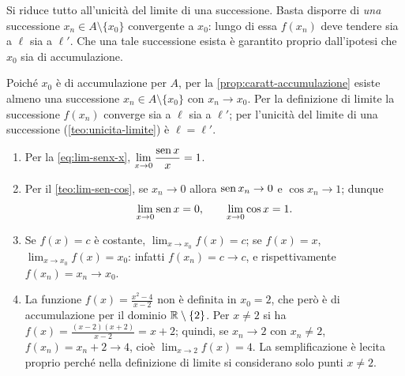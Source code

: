 \begin{schema}
\end{schema}

\begin{strategia}
Si riduce tutto all'unicità del limite di una successione. Basta disporre di
\emph{una} successione $x_{n}\in A\setminus\{x_{0}\}$ convergente a $x_{0}$: lungo di
essa $f(x_{n})$ deve tendere sia a $\ell$ sia a $\ell'$. Che una tale successione esista
è garantito proprio dall'ipotesi che $x_{0}$ sia di accumulazione.
\end{strategia}

\begin{dimostrazione}
Poiché $x_{0}$ è di accumulazione per $A$, per la \cref{prop:caratt-accumulazione}
esiste almeno una successione $x_{n}\in A\setminus\{x_{0}\}$ con $x_{n}\to x_{0}$. Per
la definizione di limite la successione $f(x_{n})$ converge sia a $\ell$ sia a $\ell'$;
per l'unicità del limite di una successione (\cref{teo:unicita-limite}) è $\ell=\ell'$.
\end{dimostrazione}

\begin{esempio}\label{es:limiti-elementari}
\begin{enumerate}[label=\textup{(\roman*)}]
  \item Per la \eqref{eq:lim-senx-x}, $\displaystyle\lim_{x\to0}\frac{\operatorname{sen} x}{x}=1$.
  \item Per il \cref{teo:lim-sen-cos}, se $x_{n}\to0$ allora $\operatorname{sen} x_{n}\to0$ e
  $\cos x_{n}\to1$; dunque
  \begin{equation}\label{eq:lim-sen-cos-0}
    \lim_{x\to0}\operatorname{sen} x=0, \qquad \lim_{x\to0}\cos x=1 .
  \end{equation}
  \item Se $f(x)=c$ è costante, $\lim_{x\to x_{0}}f(x)=c$; se $f(x)=x$,
  $\lim_{x\to x_{0}}f(x)=x_{0}$: infatti $f(x_{n})=c\to c$, e rispettivamente
  $f(x_{n})=x_{n}\to x_{0}$.
  \item La funzione $f(x)=\frac{x^{2}-4}{x-2}$ non è definita in $x_{0}=2$, che però è di
  accumulazione per il dominio $\mathbb{R}\setminus\{2\}$. Per $x\neq2$ si ha
  $f(x)=\frac{(x-2)(x+2)}{x-2}=x+2$; quindi, se $x_{n}\to2$ con $x_{n}\neq2$,
  $f(x_{n})=x_{n}+2\to4$, cioè $\lim_{x\to2}f(x)=4$. La semplificazione è lecita
  proprio perché nella definizione di limite si considerano solo punti $x\neq2$.
\end{enumerate}
\end{esempio}

